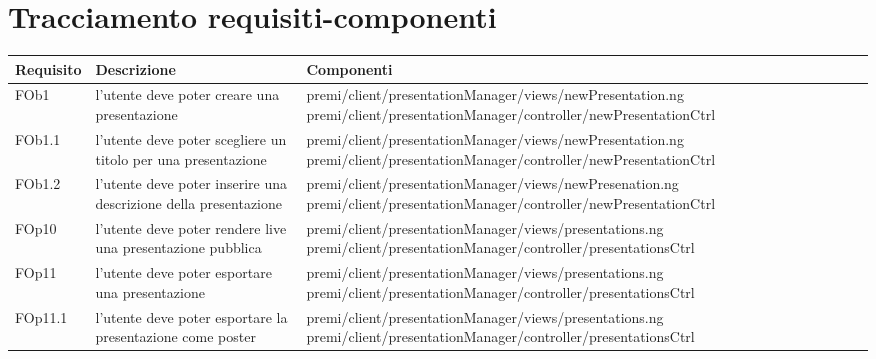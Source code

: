 \newpage
\section{Tracciamento requisiti-componenti}	
\begin{longtable}{|l|p{5cm}|p{7cm}|}
\hline
\textbf{Requisito}  & \textbf{Descrizione} & \textbf{Componenti} \\
\hline
FOb1 & l'utente deve poter creare una presentazione & \hspace{0pt}premi/client/presentationManager/views/newPresentation.ng \linebreak \linebreak premi/client/presentationManager/controller/newPresentationCtrl \\
\hline
FOb1.1 & l'utente deve poter scegliere un titolo per una presentazione & \hspace{0pt}premi/client/presentationManager/views/newPresentation.ng \linebreak \linebreak premi/client/presentationManager/controller/newPresentationCtrl \\
\hline
FOb1.2 & l'utente deve poter inserire una descrizione della presentazione & \hspace{0pt}premi/client/presentationManager/views/newPresenation.ng \linebreak \linebreak premi/client/presentationManager/controller/newPresentationCtrl \\
\hline
FOp10 & l'utente deve poter rendere live una presentazione pubblica & \hspace{0pt}premi/client/presentationManager/views/presentations.ng \linebreak \linebreak premi/client/presentationManager/controller/presentationsCtrl \\
\hline
FOp11 & l'utente deve poter esportare una presentazione & \hspace{0pt}premi/client/presentationManager/views/presentations.ng \linebreak \linebreak premi/client/presentationManager/controller/presentationsCtrl \\
\hline
FOp11.1 & l'utente deve poter esportare la presentazione come poster & \hspace{0pt}premi/client/presentationManager/views/presentations.ng \linebreak \linebreak premi/client/presentationManager/controller/presentationsCtrl \\

\end{longtable}
